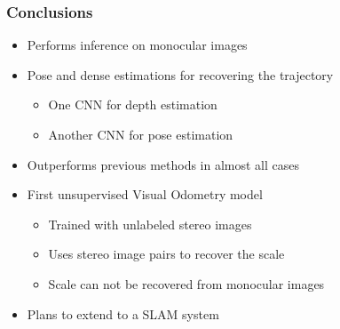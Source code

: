 \begin{frame}
    \frametitle{Conclusions}
    \begin{itemize}
        \item Performs inference on monocular images
        \item Pose and dense estimations for recovering the trajectory
            \begin{itemize}
                \item One CNN for depth estimation
                \item Another CNN for pose estimation
            \end{itemize}
        \item Outperforms previous methods in almost all cases
        \item First unsupervised Visual Odometry model
        \begin{itemize}
            \item Trained with unlabeled stereo images
            \item Uses stereo image pairs to recover the scale
            \item Scale can not be recovered from monocular images
        \end{itemize}
        \item Plans to extend to a SLAM system
    \end{itemize}
\end{frame}
